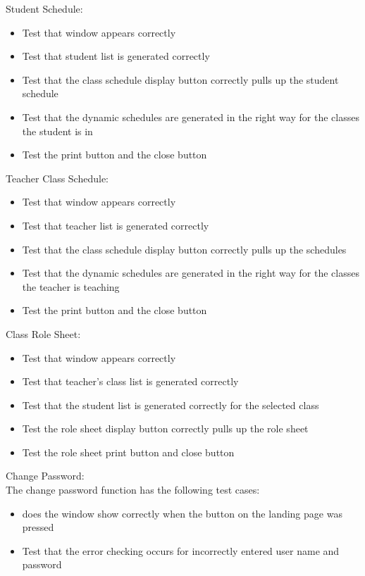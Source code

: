 Student Schedule:\\

\begin{itemize}
\item Test that window appears correctly
\item Test that student list is generated correctly
\item Test that the class schedule display button correctly pulls up the student schedule
\item Test that the dynamic schedules are generated in the right way for the classes the student is in
\item Test the print button and the close button
\end{itemize}

Teacher Class Schedule:\\

\begin{itemize}
\item Test that window appears correctly
\item Test that teacher list is generated correctly
\item Test that the class schedule display button correctly pulls up the schedules 
\item Test that the dynamic schedules are generated in the right way for the classes the teacher is teaching
\item Test the print button and the close button
\end{itemize}

Class Role Sheet:\\

\begin{itemize}
\item Test that window appears correctly
\item Test that teacher's class list is generated correctly
\item Test that the student list is generated correctly for the selected class
\item Test the role sheet display button correctly pulls up the role sheet
\item Test the role sheet print button and close button
\end{itemize}

Change Password:\\
The change password function has the following test cases:

\begin{itemize}
\item does the window show correctly when the button on the landing page was pressed
\item Test that the error checking occurs for incorrectly entered user name and password 
\end{itemize}

